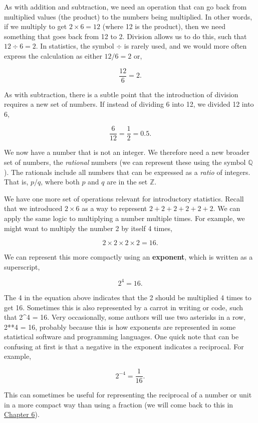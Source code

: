 \documentclass[
]{scrbook}
\begin{document}
As with addition and subtraction, we need an operation that can go back from multiplied values (the product) to the numbers being multiplied.
In other words, if we multiply to get \(2 \times 6 = 12\) (where 12 is the product), then we need something that goes back from 12 to 2.
Division allows us to do this, such that \(12 \div 6 = 2\).
In statistics, the symbol \(\div\) is rarely used, and we would more often express the calculation as either \(12/6 = 2\) or,

\[\frac{12}{6} = 2.\]

As with subtraction, there is a subtle point that the introduction of division requires a new set of numbers.
If instead of dividing 6 into 12, we divided 12 into 6,

\[\frac{6}{12} = \frac{1}{2} = 0.5.\]

We now have a number that is not an integer.
We therefore need a new broader set of numbers, the \emph{rational} numbers (we can represent these using the symbol \(\mathbb{Q}\)).
The rationals include all numbers that can be expressed as a \emph{ratio} of integers.
That is, \(p / q\), where both \(p\) and \(q\) are in the set \(\mathbb{Z}\).

We have one more set of operations relevant for introductory statistics.
Recall that we introduced \(2 \times 6\) as a way to represent \(2 + 2 + 2 + 2 + 2 + 2\).
We can apply the same logic to multiplying a number multiple times.
For example, we might want to multiply the number 2 by itself 4 times,

\[2 \times 2 \times 2 \times 2 = 16.\]

We can represent this more compactly using an \textbf{exponent}, which is written as a superscript,

\[2^{4} = 16.\]

The 4 in the equation above indicates that the 2 should be multiplied 4 times to get 16.
Sometimes this is also represented by a carrot in writing or code, such that 2\^{}4 = 16.
Very occasionally, some authors will use two asterisks in a row, 2**4 = 16, probably because this is how exponents are represented in some statistical software and programming languages.
One quick note that can be confusing at first is that a negative in the exponent indicates a reciprocal.
For example,

\[2^{-4} = \frac{1}{16}.\]

This can sometimes be useful for representing the reciprocal of a number or unit in a more compact way than using a fraction (we will come back to this in \protect\hyperlink{Chapter_6}{Chapter 6}).
\end{document}
